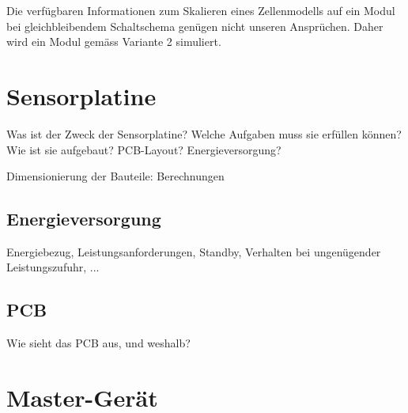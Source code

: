 Die  verf\"ugbaren   Informationen  zum  Skalieren  eines   Zellenmodells  auf
ein   Modul  bei   gleichbleibendem  Schaltschema   gen\"ugen  nicht   unseren
Anspr\"uchen. Daher wird ein Modul gem\"ass Variante 2 simuliert.




\clearpage
\section{Sensorplatine}
\label{sec:hw:sensorplatine}

Was  ist der  Zweck  der Sensorplatine? Welche  Aufgaben  muss sie  erf\"ullen
k\"onnen? Wie ist sie aufgebaut? PCB-Layout? Energieversorgung?

\anweisung Dimensionierung der Bauteile: Berechnungen

\subsection{Energieversorgung}
\label{subsec:sensor:pcb}

Energiebezug,  Leistungsanforderungen, Standby,  Verhalten bei  ungen\"ugender
Leistungszufuhr, ...


\subsection{PCB}
\label{subsec:sensor:pcb}

Wie sieht das PCB aus, und weshalb?

\section{Master-Ger\"at}
\label{sec:hw:mastergerat}

